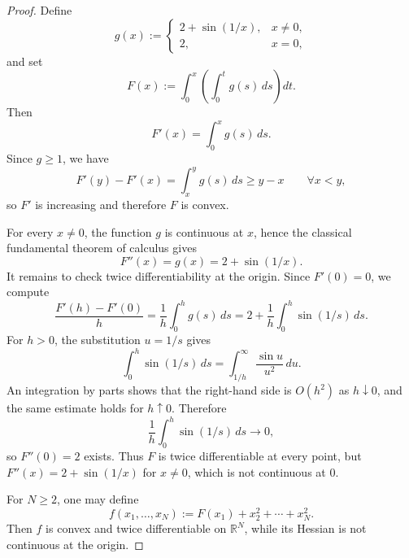 \documentclass[reqno]{amsart}
\theoremstyle{definition}
\newcommand{\R}{\mathbb{R}}
\begin{document}
\begin{proof}
Define
\begin{equation}
    g(x):=
    \begin{cases}
        2+\sin(1/x), & x \neq 0, \\
        2, & x=0,
    \end{cases}
\end{equation}
and set
\begin{equation}
    F(x):=\int_0^x \left(\int_0^t g(s)\,ds\right)dt.
\end{equation}
Then
\begin{equation}
    F'(x)=\int_0^x g(s)\,ds.
\end{equation}
Since $g \geq 1$, we have
\begin{equation}
    F'(y)-F'(x)=\int_x^y g(s)\,ds \geq y-x \qquad \forall x<y,
\end{equation}
so $F'$ is increasing and therefore $F$ is convex.

For every $x \neq 0$, the function $g$ is continuous at $x$, hence the classical
fundamental theorem of calculus gives
\begin{equation}
    F''(x)=g(x)=2+\sin(1/x).
\end{equation}
It remains to check twice differentiability at the origin. Since $F'(0)=0$, we
compute
\begin{equation}
    \frac{F'(h)-F'(0)}{h}=\frac{1}{h}\int_0^h g(s)\,ds
    =2+\frac{1}{h}\int_0^h \sin(1/s)\,ds.
\end{equation}
For $h>0$, the substitution $u=1/s$ gives
\begin{equation}
    \int_0^h \sin(1/s)\,ds=\int_{1/h}^{\infty} \frac{\sin u}{u^2}\,du.
\end{equation}
An integration by parts shows that the right-hand side is $O(h^2)$ as
$h \downarrow 0$, and the same estimate holds for $h \uparrow 0$. Therefore
\begin{equation}
    \frac{1}{h}\int_0^h \sin(1/s)\,ds \to 0,
\end{equation}
so $F''(0)=2$ exists. Thus $F$ is twice differentiable at every point, but
$F''(x)=2+\sin(1/x)$ for $x \neq 0$, which is not continuous at $0$.

For $N \geq 2$, one may define
\begin{equation}
    f(x_1,\dots,x_N):=F(x_1)+x_2^2+\cdots+x_N^2.
\end{equation}
Then $f$ is convex and twice differentiable on $\R^N$, while its Hessian is not
continuous at the origin.
\end{proof}
\end{document}

